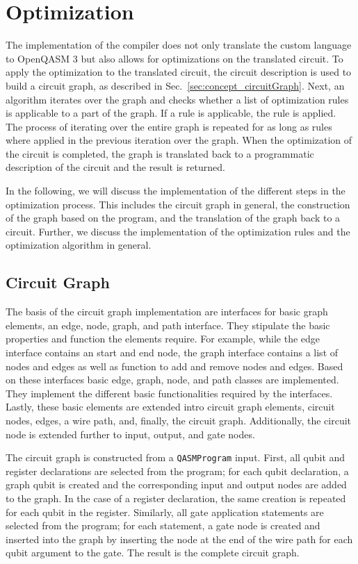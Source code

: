 \section{Optimization}
The implementation of the compiler does not only translate the custom language to OpenQASM 3 but
also allows for optimizations on the translated circuit. 
To apply the optimization to the translated circuit, the circuit description is used to build a circuit graph, as described in Sec.~\ref{sec:concept_circuitGraph}. Next, an algorithm iterates over the graph and checks whether a list of optimization rules is applicable to a part of the graph. If a rule is applicable, the rule is applied. The process of iterating over the entire graph is repeated for as long as rules where applied in the previous iteration over the graph. When the optimization of the circuit is completed, the graph is translated back to a programmatic description of the circuit and the result is returned.

In the following, we will discuss the implementation of the different steps in the optimization process. This includes the circuit graph in general, the construction of the graph based on the program, and the translation of the graph back to a circuit. Further, we discuss the implementation of the optimization rules and the optimization algorithm in general.

\subsection{Circuit Graph}
The basis of the circuit graph implementation are interfaces for basic graph elements, \ie an edge, node, graph, and path interface. They stipulate the basic properties and function the elements require. For example, while the edge interface contains an start and end node, the graph interface contains a list of nodes and edges as well as function to add and remove nodes and edges. Based on these interfaces basic edge, graph, node, and path classes are implemented. They implement the different basic functionalities required by the interfaces. Lastly, these basic elements are extended intro circuit graph elements, circuit nodes, edges, a wire path, and, finally, the circuit graph. Additionally, the circuit node is extended further to input, output, and gate nodes.

The circuit graph is constructed from a \texttt{QASMProgram} input. First, all qubit and register declarations are selected from the program; for each qubit declaration, a graph qubit is created and the corresponding input and output nodes are added to the graph. In the case of a register declaration, the same creation is repeated for each qubit in the register. Similarly, all gate application statements are selected from the program; for each statement, a gate node is created and inserted into the graph by inserting the node at the end of the wire path for each qubit argument to the gate. The result is the complete circuit graph. 

